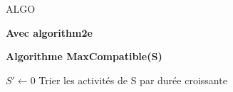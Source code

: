 \documentclass[12pt,french]{report}
\begin{document}
\begin{spacing}{1.2}
\begin{center}
\begin{minipage}{0.55\linewidth}
\begin{mybox}[colback=blue!10]{ALGO}


\end{mybox}
\end{minipage}
\end{center}


\textbf{Avec algorithm2e}

%



\normalem %
\DontPrintSemicolon %
\SetAlgoVlined %

\hspace*{2em}\textbf{Algorithme MaxCompatible(S)}

\hspace*{3em}\begin{algorithm}[H]
$S' \leftarrow 0$\;
Trier les activités de S par durée croissante\;
\end{algorithm}
\ULforem %




\end{spacing}
\end{document}
